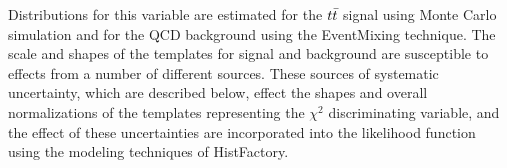 Distributions for this variable are estimated for the $t\bar{t}$ signal using Monte Carlo simulation and for the QCD background using the EventMixing technique.
The scale and shapes of the templates for signal and background are susceptible to effects from a number of different sources.
These sources of systematic uncertainty, which are described below, effect the shapes and overall normalizations of the templates
representing the $\chi^2$ discriminating variable, and the effect of these uncertainties are incorporated into the likelihood
function using the modeling techniques of HistFactory.


